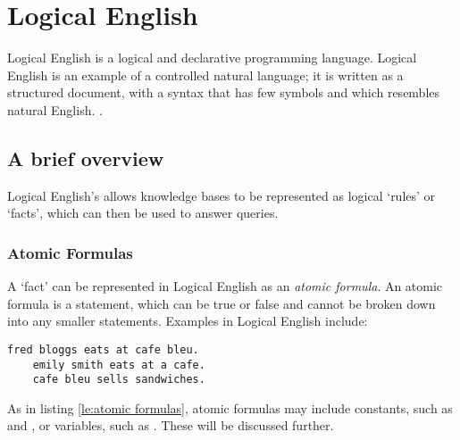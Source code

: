 \documentclass[../main.tex]{subfiles}
\begin{document}
\chapter{Logical English}
\label{chapter:le}
Logical English is a logical and declarative programming language. Logical English is an example of a controlled natural language; it is written as a structured document, with a syntax that has few symbols and which resembles natural English. \cite{logical_english}.

\section{A brief overview}
Logical English's allows knowledge bases to be represented as logical `rules' or `facts', which can then be used to answer queries. 

\subsection{Atomic Formulas}
A `fact' can be represented in Logical English as an \textit{atomic formula}. An atomic formula is a statement, which can be true or false and cannot be broken down into any smaller statements. Examples in Logical English include:
\begin{lstlisting}[language={LE},caption={An example of three atomic formulas in Logical English.},label={le:atomic formulas}]
    fred bloggs eats at cafe bleu.
    emily smith eats at a cafe.
    cafe bleu sells sandwiches.
\end{lstlisting}
As in listing \ref{le:atomic formulas}, atomic formulas may include constants, such as  and , or variables, such as . These will be discussed further.
\end{document}
